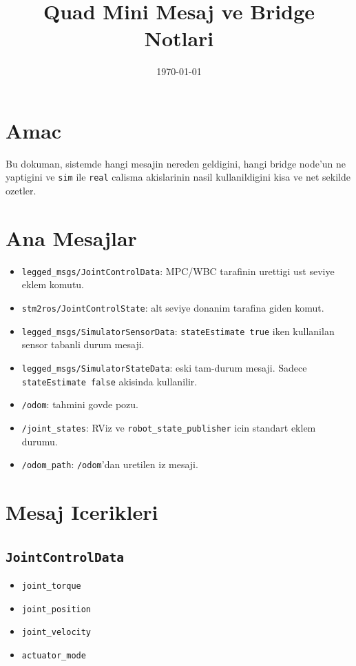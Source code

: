 \documentclass[11pt]{article}
\title{Quad Mini Mesaj ve Bridge Notlari}
\author{}
\date{\today}
\begin{document}
\maketitle

\section*{Amac}
Bu dokuman, sistemde hangi mesajin nereden geldigini, hangi bridge node'un ne yaptigini ve \texttt{sim} ile \texttt{real} calisma akislarinin nasil kullanildigini kisa ve net sekilde ozetler.

\section*{Ana Mesajlar}
\begin{itemize}
  \item \texttt{legged\_msgs/JointControlData}: MPC/WBC tarafinin urettigi ust seviye eklem komutu.
  \item \texttt{stm2ros/JointControlState}: alt seviye donanim tarafina giden komut.
  \item \texttt{legged\_msgs/SimulatorSensorData}: \texttt{stateEstimate true} iken kullanilan sensor tabanli durum mesaji.
  \item \texttt{legged\_msgs/SimulatorStateData}: eski tam-durum mesaji. Sadece \texttt{stateEstimate false} akisinda kullanilir.
  \item \texttt{/odom}: tahmini govde pozu.
  \item \texttt{/joint\_states}: RViz ve \texttt{robot\_state\_publisher} icin standart eklem durumu.
  \item \texttt{/odom\_path}: \texttt{/odom}'dan uretilen iz mesaji.
\end{itemize}

\section*{Mesaj Icerikleri}
\subsection*{\texttt{JointControlData}}
\begin{itemize}
  \item \texttt{joint\_torque}
  \item \texttt{joint\_position}
  \item \texttt{joint\_velocity}
  \item \texttt{actuator\_mode}
\end{itemize}
\end{document}
